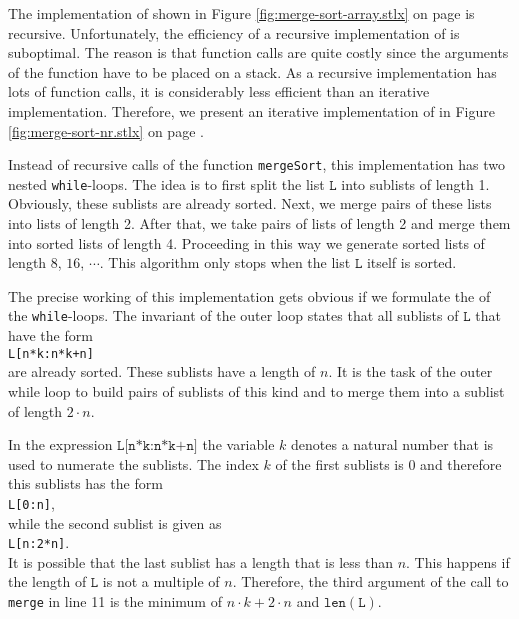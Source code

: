 \noindent
The implementation of  shown in Figure \ref{fig:merge-sort-array.stlx} on page
\pageref{fig:merge-sort-array.stlx} is recursive.  Unfortunately, the efficiency of a recursive
implementation of  is suboptimal.  The reason is that function calls are quite
costly since the arguments of the function have to be placed on a stack.  As a recursive
implementation has lots of function calls, it is considerably less efficient than an iterative
implementation.  Therefore, we present an iterative implementation of  in Figure
\ref{fig:merge-sort-nr.stlx} on page \pageref{fig:merge-sort-nr.stlx}.

Instead of recursive calls of the function \texttt{mergeSort}, this implementation has two nested 
\texttt{while}-loops.  The idea is to first split the list $\texttt{L}$ into sublists of length 1.
Obviously, these sublists are already sorted.  Next, we merge pairs of these lists into lists of
length 2.  After that, we take pairs of lists of length 2 and merge them into sorted lists of length
4. Proceeding in this way we generate sorted lists of length
$8$, $16$, $\cdots$.  This algorithm only stops when the list $\texttt{L}$ itself is sorted.

The precise working of this implementation gets obvious if we formulate the  of the
\texttt{while}-loops.  The invariant of the outer loop states that all sublists of $\texttt{L}$ 
that have the form
\\[0.2cm]
\hspace*{1.3cm}
\texttt{L[n*k:n*k+n]}
\\[0.2cm]
are already sorted.  These sublists have a length of $n$.  It is the task of the outer while loop to build
pairs of sublists of this kind and to merge them into a sublist of length $2 \cdot n$.

In the expression $\texttt{L[n*k:n*k+n]}$ the variable $k$ denotes a natural
number that is used to numerate the sublists.  The index $k$ of the first sublists is $0$ and
therefore this sublists has the form
\\[0.2cm]
\hspace*{1.3cm}
\texttt{L[0:n]},
\\[0.2cm]
while the second sublist is given as
\\[0.2cm]
\hspace*{1.3cm}
\texttt{L[n:2*n]}.
\\[0.2cm]
It is possible that the last sublist has a length that is less than $n$.  This happens if the length
of $\texttt{L}$ is not a multiple of $n$.  Therefore, the third argument of the call to \texttt{merge}
in line 11 is the minimum of $n\cdot k + 2\cdot n$ and $\texttt{len}(\texttt{L})$.

